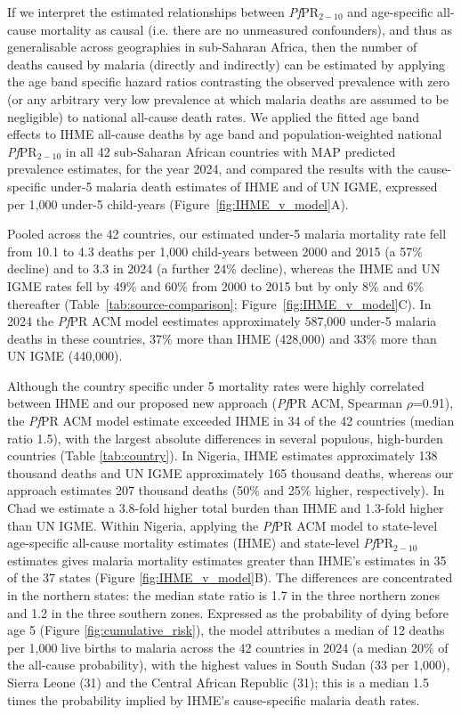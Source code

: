 \documentclass[12pt]{article}
\begin{document}
If we interpret the estimated relationships between \textit{Pf}PR$_{2-10}$ and age-specific all-cause mortality as causal (i.e. there are no unmeasured confounders), and thus as generalisable across geographies in sub-Saharan Africa, then the number of deaths caused by malaria (directly and indirectly) can be estimated by applying the age band specific hazard ratios contrasting the observed prevalence with zero (or any arbitrary very low prevalence at which malaria deaths are assumed to be negligible) to national all-cause death rates. We applied the fitted age band effects to IHME all-cause deaths by age band and population-weighted national \textit{Pf}PR$_{2-10}$ in all 42 sub-Saharan African countries with MAP predicted prevalence estimates, for the year 2024, and compared the results with the cause-specific under-5 malaria death estimates of IHME and of UN IGME, expressed per 1,000 under-5 child-years (Figure~\ref{fig:IHME_v_model}A).

Pooled across the 42 countries, our estimated under-5 malaria mortality rate fell from 10.1 to 4.3 deaths per 1,000 child-years between 2000 and 2015 (a 57\% decline) and to 3.3 in 2024 (a further 24\% decline), whereas the IHME and UN IGME rates fell by 49\% and 60\% from 2000 to 2015 but by only 8\% and 6\% thereafter (Table~\ref{tab:source-comparison}; Figure~\ref{fig:IHME_v_model}C). In 2024 the \textit{Pf}PR ACM model eestimates approximately 587,000 under-5 malaria deaths in these countries, 37\% more than IHME (428,000) and 33\% more than UN IGME (440,000).


Although the country specific under 5 mortality rates were highly correlated between IHME and our proposed new approach (\textit{Pf}PR ACM, Spearman $\rho$=0.91), the \textit{Pf}PR ACM model estimate exceeded IHME in 34 of the 42 countries (median ratio 1.5), with the largest absolute differences in several populous, high-burden countries (Table \ref{tab:country}).
In Nigeria, IHME estimates approximately 138 thousand deaths and UN IGME approximately 165 thousand deaths, whereas our approach estimates 207 thousand deaths (50\% and 25\% higher, respectively).
In Chad we estimate a 3.8-fold higher total burden than IHME and 1.3-fold higher than UN IGME. Within Nigeria, applying the \textit{Pf}PR ACM model to state-level age-specific all-cause mortality estimates (IHME) and state-level \textit{Pf}PR$_{2-10}$ estimates gives malaria mortality estimates greater than IHME's estimates in 35 of the 37 states (Figure \ref{fig:IHME_v_model}B). The differences are concentrated in the northern states: the median state ratio is 1.7 in the three northern zones and 1.2 in the three southern zones. Expressed as the probability of dying before age 5 (Figure \ref{fig:cumulative_risk}), the model attributes a median of 12 deaths per 1,000 live births to malaria across the 42 countries in 2024 (a median 20\% of the all-cause probability), with the highest values in South Sudan (33 per 1,000), Sierra Leone (31) and the Central African Republic (31); this is a median 1.5 times the probability implied by IHME's cause-specific malaria death rates.
\end{document}
